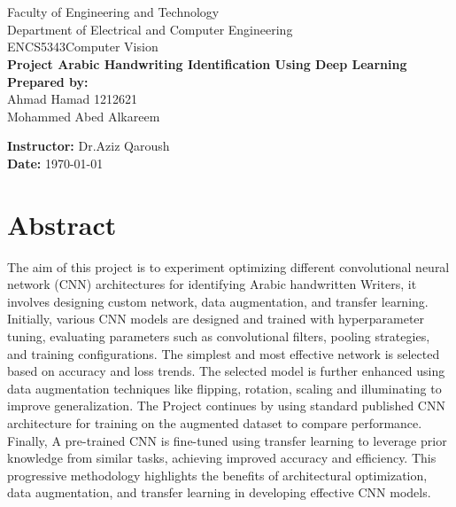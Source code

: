 \documentclass[12pt]{article}
\def \LOGOPATH {assets/birzeit-logo.svg}
\def \FACULTY {Faculty of Engineering and Technology}
\def \DEPARTEMENT {Department of Electrical and Computer Engineering}
\def \COURSENUM {ENCS5343}
\def \COURSENAME {Computer Vision }
\def \ASSIGNMENTTITLE {Project }
\def \ASSIGNMENTDESCRIPTION {Arabic Handwriting Identification Using Deep Learning }
\def \STUDENTNAME {\\Ahmad Hamad 1212621 \\  Mohammed Abed Alkareem }
\def \STUDENTID {1210708}
\def \INSTRUCTOR {Dr.Aziz Qaroush}
\begin{document}

\begin{titlepage}
    \vfill
    \begin{center}
         \\
        \hfill \\
        \Large{\FACULTY} \\
        \Large{\DEPARTEMENT} \\
        \Large{\COURSENUM\textemdash\COURSENAME} \\
        \vfill
        \textbf{\LARGE{\ASSIGNMENTTITLE\textemdash\ASSIGNMENTDESCRIPTION}} \\
        \vspace{20pt}
        \Large{\textbf{Prepared by:} \STUDENTNAME\textemdash\STUDENTID}
    \end{center}
    \vfill
    \begin{flushleft}
        \Large{\textbf{Instructor:} \INSTRUCTOR} \\
        \Large{\textbf{Date:} \today}
    \end{flushleft}
\end{titlepage}


\section*{Abstract}
\label{sec:abstract}

The aim of this project is to experiment optimizing different convolutional neural network (CNN) architectures for identifying Arabic handwritten Writers, it involves designing custom network, data augmentation, and transfer learning. Initially, various CNN models are designed and trained with hyperparameter tuning, evaluating parameters such as convolutional filters, pooling strategies, and training configurations. The simplest and most effective network is selected based on accuracy and loss trends.
The selected model is further enhanced using data augmentation techniques like flipping, rotation, scaling and illuminating to improve generalization. The Project continues by using standard published CNN architecture for training on the augmented dataset to compare performance. Finally, A pre-trained CNN is fine-tuned using transfer learning to leverage prior knowledge from similar tasks, achieving improved accuracy and efficiency.
This progressive methodology highlights the benefits of architectural optimization, data augmentation, and transfer learning in developing effective CNN models.
\end{document}
